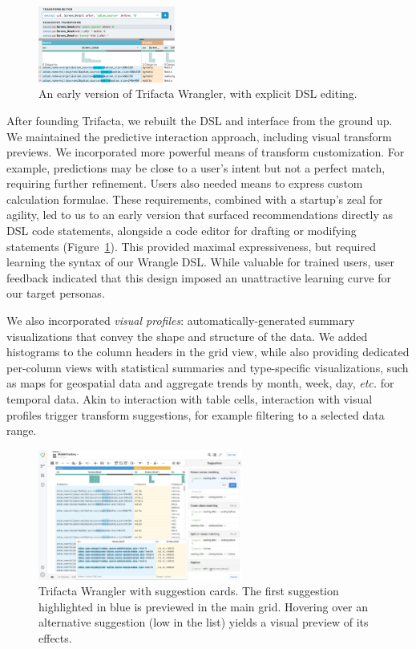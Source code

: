 \documentclass[11pt]{article}
\begin{document}
\begin{figure}
    \centering
    \includegraphics[width=0.4\textwidth]{figs/old_trifacta.png}
    \caption{An early version of Trifacta Wrangler, with explicit DSL editing.}
    \label{fig:trifacta_early}
\end{figure}
After founding Trifacta, we rebuilt the DSL and interface from the ground up. We maintained the predictive interaction approach, including visual transform previews. We incorporated more powerful means of transform customization. For example, predictions may be close to a user's intent but not a perfect match, requiring further refinement. Users also needed means to express custom calculation formulae. These requirements, combined with %
a startup's zeal for agility, led to us to an early version that surfaced recommendations directly as DSL code statements, alongside a code editor for drafting or modifying statements (Figure~\ref{fig:trifacta_early}). This provided maximal expressiveness, but required learning the syntax of our Wrangle DSL. While valuable for trained users, user feedback indicated that this design imposed an unattractive learning curve for our target personas.

We also incorporated \emph{visual profiles}: automatically-generated summary visualizations that convey the shape and structure of the data. We added histograms to the column headers in the grid view, while also providing dedicated per-column views with statistical summaries and type-specific visualizations, such as maps for geospatial data and aggregate trends by month, week, day, \emph{etc.}{} for temporal data. Akin to interaction with table cells, interaction with visual profiles trigger transform suggestions, for example filtering to a selected data range.
\begin{figure}
    \includegraphics[width=0.6\textwidth] {figs/trifacta-cards.jpeg}%
        \caption{Trifacta Wrangler with suggestion cards. The first suggestion highlighted in blue is previewed in the main grid. Hovering over an alternative suggestion (low in the list) yields a visual preview of its effects.}
        \label{fig:trifacta_cards}
\end{figure}
\end{document}
